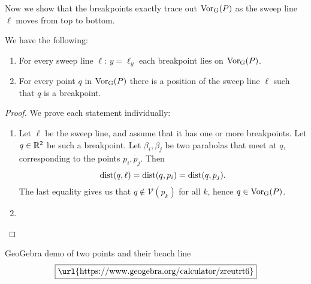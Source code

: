 Now we show that the breakpoints exactly trace out $\operatorname{Vor_{G}}(P)$ as the sweep line $\ell$ moves from top to bottom.
\begin{thm}
We have the following:
\begin{enumerate}[{(}i{)}]
\item For every sweep line $\ell$: $y = \ell_y$ each breakpoint lies on $\operatorname{Vor_{G}}(P)$.
\item For every point $q$ in $\operatorname{Vor_{G}}(P)$ there is a position of the sweep line $\ell$ such that $q$ is a breakpoint.
\end{enumerate}
\end{thm}
\begin{proof}
We prove each statement individually:
\begin{enumerate}[{(}i{):}]
    \item Let $\ell$ be the sweep line, and assume that it has one or more breakpoints. Let $q \in \mathbb{R}^2$ be such a breakpoint. Let $\beta_i, \beta_j$ be two parabolas that meet at $q$, corresponding to the points $p_i, p_j$. Then
    \[
        \operatorname{dist}(q, \ell) = \operatorname{dist}(q, p_i) = \operatorname{dist}(q, p_j).
    \]
    The last equality gives us that $q \not\in \mathcal{V}(p_k)$ for all $k$, hence $q \in \operatorname{Vor_{G}}(P)$.
    \item {}
\end{enumerate}
\end{proof}

GeoGebra demo of two points and their beach line
\[
    \boxed{\text{\url{https://www.geogebra.org/calculator/zreutrt6}}}
\]
